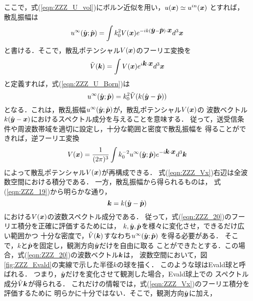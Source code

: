 ここで，式(\ref{eqn:ZZZ_U_vol})にボルン近似を用い，$u(\mbox{\boldmath $x$})\simeq u^{in}(\mbox{\boldmath $x$})$
とすれば，散乱振幅は
\begin{equation}
	u^{\infty}(\hat{\mbox{\boldmath $y$}};\hat{\mbox{\boldmath $p$}})
	=
	\int
	k_0^2 V(\mbox{\boldmath $x$}) e^{-ik(\hat{\mbox{\boldmath $y$}}-\hat{\mbox{\boldmath $p$}})\cdot \mbox{\boldmath $x$}}d^3\mbox{\boldmath $x$}
	\label{eqn:ZZZ_U_Born}
\end{equation}
と書ける．そこで，散乱ポテンシャル$V(\mbox{\boldmath $x$})$のフーリエ変換を
\begin{equation}
	\tilde V(\mbox{\boldmath $k$}) = \int V(\mbox{\boldmath $x$}) e^{i\mbox{\boldmath $k$}\cdot \mbox{\boldmath $x$}} d^3\mbox{\boldmath $x$}
	\label{eqn:ZZZ_Vk}
\end{equation}
と定義すれば，式(\ref{eqn:ZZZ_U_Born})は
\begin{equation}
	u^{\infty}(\hat{\mbox{\boldmath $y$}};\hat{\mbox{\boldmath $p$}}) =k_0^2 \tilde V (
	k(\hat{\mbox{\boldmath $y$}}-\hat{\mbox{\boldmath $p$}} )
	)
	\label{eqn:ZZZ_19}
\end{equation}
となる．これは，散乱振幅$u^{\infty}(\hat{\mbox{\boldmath $y$}};\hat{\mbox{\boldmath $p$}})$が，散乱ポテンシャル$V(\mbox{\boldmath $x$})$の
波数ベクトル$k(\hat{\mbox{\boldmath $y$}}-\mbox{\boldmath $x$})$におけるスペクトル成分を与えることを意味する．
従って，送受信条件や周波数帯域を適切に設定し，十分な範囲と密度で散乱振幅を
得ることができれば，逆フーリエ変換
\begin{equation}
	V(\mbox{\boldmath $x$}) =\frac{1}{(2\pi)^3} \int k_0^{-2} u^{\infty}(\hat{\mbox{\boldmath $y$}};\hat{\mbox{\boldmath $p$}}) 
	e^{-i\mbox{\boldmath $k$}\cdot \mbox{\boldmath $x$}}d^3\mbox{\boldmath $k$}
	\label{eqn:ZZZ_Vx}
\end{equation}
によって散乱ポテンシャル$V(\mbox{\boldmath $x$})$が再構成できる．
式(\ref{eqn:ZZZ_Vx})右辺は全波数空間における積分である．
一方，散乱振幅から得られるものは， 式(\ref{eqn:ZZZ_19})から明らかな通り，
\begin{equation}
	\mbox{\boldmath $k$}=k(\hat{\mbox{\boldmath $y$}}-\hat{\mbox{\boldmath $p$}})
	\label{eqn:ZZZ_20}
\end{equation}
における$V(\mbox{\boldmath $x$})$の波数スペクトル成分である．
従って，式(\ref{eqn:ZZZ_20})のフーリエ積分を正確に評価するためには，
$k,\hat{\mbox{\boldmath $y$}},\hat{\mbox{\boldmath $p$}}$を様々に変化させ，できるだけ広い範囲かつ
十分な密度で，$\tilde V(\mbox{\boldmath $k$})$すなわち$u^{\infty}(\hat{\mbox{\boldmath $y$}};\hat{\mbox{\boldmath $p$}})$
を得る必要がある．
そこで，$k$と$\hat{\mbox{\boldmath $p$}}$を固定し，観測方向$\hat{\mbox{\boldmath $y$}}$だけを自由に取る
ことができたとする．この場合，式(\ref{eqn:ZZZ_20})の波数ベクトル$\mbox{\boldmath $k$}$は，
波数空間において，図\ref{fig:ZZZ_Evald}の実線で示した半径$k$の球を描く．
このような球はEvald球と呼ばれる．
つまり，$\hat{\mbox{\boldmath $y$}}$だけを変化させて観測した場合，Evald球上での
スペクトル成分$\tilde V{\mbox{\boldmath $k$}}$が得られる．
これだけの情報では，式(\ref{eqn:ZZZ_Vx})のフーリエ積分を評価するために
明らかに十分ではない．そこで，観測方向$\hat{\mbox{\boldmath $y$}}$に加え，
